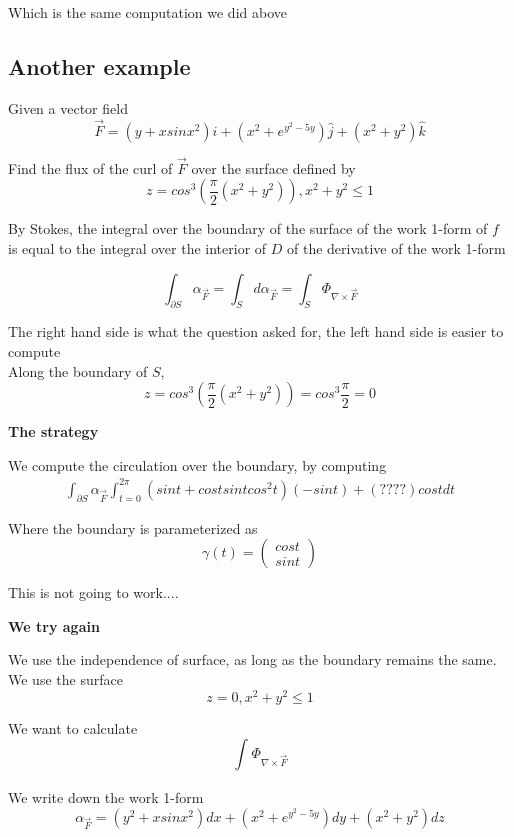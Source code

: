 Which is the same computation we did above

\subsection{Another example}

Given a vector field
\[
   \vec{F} = (y + x sinx^2) \hat{i} + \left( x^2 + e^{y^2 -5y} \right)\hat{j} + (x^2 + y^2) \hat{k} 
\] 

Find the flux of the curl of $\vec{F}$ over the surface defined by \[
  z = cos^3 \left( \frac{\pi}{2} \left( x^2 + y^2 \right)  \right), x^2 + y^2 \leq 1
\] 

By Stokes, the integral over the boundary of the surface of the work 1-form of $f$ is equal to the integral over the interior of $D$ of the derivative of the work 1-form

\[
   \int_{\partial S}^{}  \alpha_{\vec{F}} = \int_{S}^{} d \alpha_{\vec{F}} = \int_{S}^{} \Phi_{\nabla \times \vec{F}}
\] 

The right hand side is what the question asked for, the left hand side is easier to compute \\

Along the boundary of $S$,
\[
  z = cos^3 \left(  \frac{\pi}{2} (x^2 + y^2) \right)  = cos^3 \frac{\pi}{2} = 0
\] 

\textbf{The strategy}

We compute the circulation over the boundary, by computing
\begin{align*}
   \int_{\partial S}^{}  \alpha_{\vec{F}}  \int_{t = 0}^{2 \pi}  \left( sint + cost sint cos^2 t \right) \left( -sint \right) + \left( ???? \right) cost dt
\end{align*}

Where the boundary is parameterized as 
\[
  \gamma(t) = \begin{pmatrix} cos t \\ sint  \end{pmatrix} 
\] 

This is not going to work....

\textbf{We try again}

We use the independence of surface, as long as the boundary remains the same. \\

We use the surface \[
   z = 0, x^2 + y^2 \leq 1
\] 

We want to calculate
\[
   \int_{}^{} \Phi_{\nabla \times \vec{F}}  
\] 

We write down the work 1-form
\[
   \alpha_{\vec{F}} = \left( y^2 +xsinx^2 \right) dx + \left( x^2 + e^{y^2 - 5y} \right) dy + \left( x^2 + y^2 \right) dz
\] 

